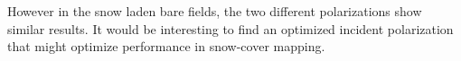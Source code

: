 
However in the snow laden bare fields, the two different polarizations show similar results. It would be interesting to find an optimized incident polarization that might optimize performance in snow-cover mapping. 









